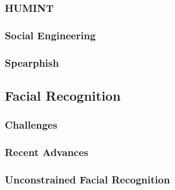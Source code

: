 \documentclass{article}
\begin{document}
\subsubsection{HUMINT}

\subsubsection{Social Engineering}

\subsubsection{Spearphish}

\subsection{Facial Recognition}

\subsubsection{Challenges}

\subsubsection{Recent Advances}

\subsubsection{Unconstrained Facial Recognition}


\end{document}
